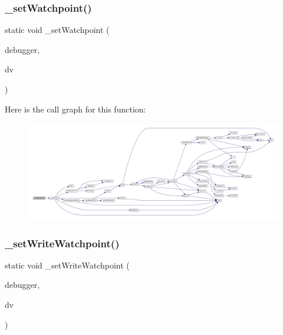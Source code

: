 \subsubsection{\texorpdfstring{\+\_\+set\+Watchpoint()}{\_setWatchpoint()}}
{\footnotesize\ttfamily static void \+\_\+set\+Watchpoint (\begin{DoxyParamCaption}\item[{struct C\+L\+I\+Debugger $\ast$}]{debugger,  }\item[{struct C\+L\+I\+Debug\+Vector $\ast$}]{dv }\end{DoxyParamCaption})\hspace{0.3cm}{\ttfamily [static]}}

Here is the call graph for this function\+:
\nopagebreak
\begin{figure}[H]
\begin{center}
\leavevmode
\includegraphics[width=350pt]{debugger_2cli-debugger_8c_a17749710370e117b89191f855280b6a1_cgraph}
\end{center}
\end{figure}
\mbox{\label{debugger_2cli-debugger_8c_af6aec1b47f652b1a4dd4f98d9e1dacc1}} 
\subsubsection{\texorpdfstring{\+\_\+set\+Write\+Watchpoint()}{\_setWriteWatchpoint()}}
{\footnotesize\ttfamily static void \+\_\+set\+Write\+Watchpoint (\begin{DoxyParamCaption}\item[{struct C\+L\+I\+Debugger $\ast$}]{debugger,  }\item[{struct C\+L\+I\+Debug\+Vector $\ast$}]{dv }\end{DoxyParamCaption})\hspace{0.3cm}{\ttfamily [static]}}

